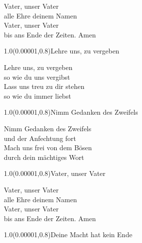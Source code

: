 \documentclass[aspectratio=169]{beamer}
\begin{document}
\begin{frame}
\centering
\color{white}
\huge{Vater, unser Vater} \\
\huge{alle Ehre deinem Namen} \\
\huge{Vater, unser Vater} \\
\huge{bis ans Ende der Zeiten. Amen} \\

\begin{textblock}{1.0}(0.00001,0.8)\color{gray}\normalsize{Lehre uns, zu vergeben}\end{textblock}
\end{frame}

\begin{frame}
\centering
\color{white}
\huge{Lehre uns, zu vergeben} \\
\huge{so wie du uns vergibst} \\
\huge{Lass uns treu zu dir stehen} \\
\huge{so wie du immer liebst} \\

\begin{textblock}{1.0}(0.00001,0.8)\color{gray}\normalsize{Nimm Gedanken des Zweifels}\end{textblock}
\end{frame}

\begin{frame}
\centering
\color{white}
\huge{Nimm Gedanken des Zweifels} \\
\huge{und der Anfechtung fort} \\
\huge{Mach uns frei von dem Bösen} \\
\huge{durch dein mächtiges Wort} \\

\begin{textblock}{1.0}(0.00001,0.8)\color{gray}\normalsize{Vater, unser Vater}\end{textblock}
\end{frame}

\begin{frame}
\centering
\color{white}
\huge{Vater, unser Vater} \\
\huge{alle Ehre deinem Namen} \\
\huge{Vater, unser Vater} \\
\huge{bis ans Ende der Zeiten. Amen} \\

\begin{textblock}{1.0}(0.00001,0.8)\color{gray}\normalsize{Deine Macht hat kein Ende}\end{textblock}
\end{frame}
\end{document}
